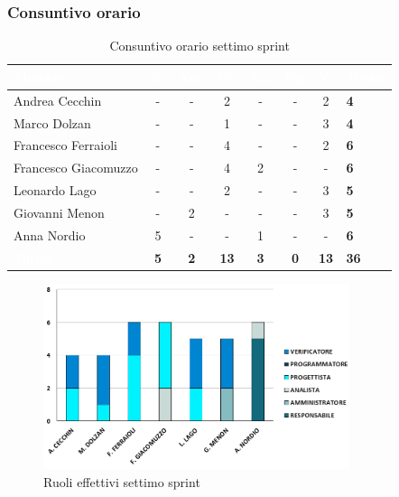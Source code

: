 \subsubsection{Consuntivo orario}
{
\setlength{\tabcolsep}{10pt}
\renewcommand{\arraystretch}{1.5}
\begin{table}[h!]
    \centering
    \begin{tabularx}{\textwidth}{| l | c | c | c | c | c | c | X |}
        \hline
        \rowcolor{headerrow} \textbf{\textcolor{white}{Membro}} & \textbf{\textcolor{white}{R.}} & \textbf{\textcolor{white}{Am.}} & \textbf{\textcolor{white}{Pj.}} & \textbf{\textcolor{white}{An.}} & \textbf{\textcolor{white}{Pg.}} & \textbf{\textcolor{white}{V.}} & \textbf{\textcolor{white}{Totale}} \\
        \hline
        Andrea Cecchin & - & -  & 2 & - & - & 2 & \textbf{4} \\
        \hline
        Marco Dolzan & - & - & 1 & - & - & 3 & \textbf{4} \\
        \hline
        Francesco Ferraioli & - & - & 4 & - & - & 2 & \textbf{6} \\
        \hline  
        Francesco Giacomuzzo & - & - & 4 & 2 & - & - & \textbf{6} \\
        \hline
        Leonardo Lago & - & - & 2 & - & - & 3 & \textbf{5} \\
        \hline
        Giovanni Menon & - & 2 & - & - & - & 3 & \textbf{5} \\
        \hline
        Anna Nordio & 5 & - & - & 1 & - & - & \textbf{6} \\
        \hline
    \cellcolor{headerrow} \textbf{\textcolor{white}{Totale}} & \textbf{5} & \textbf{2} & \textbf{13} & \textbf{3} & \textbf{0} & \textbf{13} & \textbf{36} \\
        \hline
    \end{tabularx} 
    \caption{Consuntivo orario settimo sprint}
    \label{tab:consuntivoorariosettimosprint}
\end{table}
}

\begin{figure}[h!]
    \centering
    \includegraphics[width=0.8\textwidth]{cons7ruoli.png}
    \caption{Ruoli effettivi settimo sprint}
    \label{fig:consuntivoorariosettimosprint}
\end{figure}

